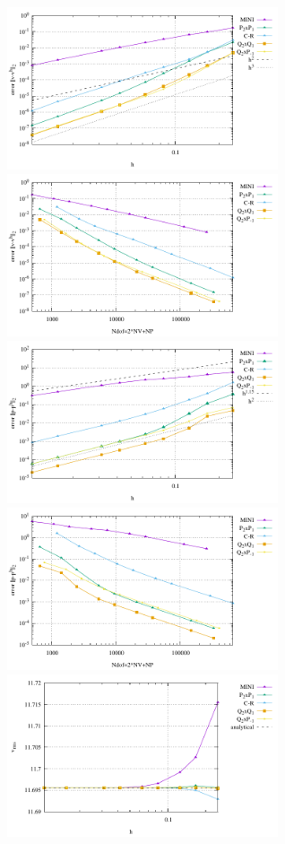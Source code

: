\begin{center}
\includegraphics[width=8cm]{python_codes/fieldstone_112/results/exp6/errors_V.pdf}
\includegraphics[width=8cm]{python_codes/fieldstone_112/results/exp6/errors_V_ndof.pdf}\\
\includegraphics[width=8cm]{python_codes/fieldstone_112/results/exp6/errors_P.pdf}
\includegraphics[width=8cm]{python_codes/fieldstone_112/results/exp6/errors_P_ndof.pdf}\\
\includegraphics[width=8cm]{python_codes/fieldstone_112/results/exp6/vrms.pdf}

\end{center}
